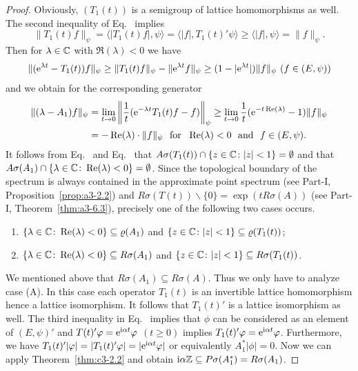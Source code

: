 \begin{proof}
	Obviously, $(T_{1}(t))$ is a semigroup of lattice homomorphisms as well. 
	The second inequality of Eq.~ implies
	\begin{equation}\label{eq:c3-4.3}
	\|T_{1}(t)f\|_{\psi} = \langle|T_{1}(t)f|,\psi\rangle = \langle|f|,T_{1}(t)'\psi\rangle \geq \langle|f|,\psi\rangle = \|f\|_{\psi} .
	\end{equation}
	Then for $\lambda \in \mathbb{C} $ with $\Re(\lambda) < 0$ we have 
	\[ 
	\|(\eu^{\lambda t}-T_{1}(t))f\|_{\psi} \geq \|T_{1}(t)f\|_{\psi}-\|\eu^{\lambda t}f\|_{\psi} \geq (1-|\eu^{\lambda t}|)\|f\|_{\psi} \ (f \in (E,\psi))
	\]
	and we obtain for the corresponding generator
	\begin{equation}\label{eq:c3-4.4}
		\begin{split}
		\|(\lambda-A_{1})f\|_{\psi} &= \lim_{t \to 0}\left\|\frac{1}{t}(\eu^{-\lambda t}T_{1}(t)f-f)\right\|_{\psi} \geq \lim_{t \to 0}\frac{1}{t}(\eu^{-t\Re(\lambda)}-1)\|f\|_{\psi}\\
		&= -\Re(\lambda)\cdot\|f\|_{\psi} \ \text{ for } \ \Re(\lambda) < 0 \ \text{ and } \ f \in (E,\psi) .
		\end{split}
	\end{equation}
	It follows from Eq.~ and Eq.~ that $A\sigma(T_{1}(t))\cap\{z \in \mathbb{C}  \colon |z| < 1\} = \emptyset$ and that $A\sigma(A_{1})\cap\{\lambda \in \mathbb{C}  \colon \mathop{}\!\mathrm{Re}(\lambda) < 0\} = \emptyset$. 
	Since the topological boundary of the spectrum is always contained in the approximate point spectrum (see Part-I, Proposition~\ref{prop:a3-2.2}) and 
    $R\sigma(T(t))\backslash\{0\} = \exp(tR\sigma(A))$ (see Part-I, Theorem~\ref{thm:a3-6.3}), precisely one of the following two cases occurs.
	\begin{enumerate}[\upshape (A)]
		\item
		$\{\lambda \in \C  \colon \Re(\lambda) < 0\} \subseteq \rho(A_{1})$ and $\{z \in \C  \colon |z| < 1\} \subseteq \rho(T_{1}(t))$;
		
		\item
		$\{\lambda \in \mathbb{C}  \colon \mathop{}\!\mathrm{Re}(\lambda) < 0\} \subseteq R\sigma(A_{1})$ and $\{z \in \mathbb{C}  \colon |z| < 1\} \subseteq R\sigma(T_{1}(t))$.
	\end{enumerate}
	
	We mentioned above that $R\sigma(A_{1}) \subseteq R\sigma(A)$. 
	Thus we only have to analyze case (A). 
	In this case each operator $T_{1}(t)$ is an invertible lattice homomorphism hence a lattice isomorphism. 
	It follows that $T_{1}(t)'$ is a lattice isomorphism as well. 
	The third inequality in Eq.~ implies that $\phi$ can be considered as an element of\/ $(E,\psi)'$ and $T(t)'\phi = \eu^{\im\alpha t}\phi$ $(t \geq 0)$ implies $T_{1}(t)'\phi = \eu^{\im\alpha t}\phi$. 
	Furthermore, we have
	$T_{1}(t)'|\phi| = |T_{1}(t)'\phi| = |\eu^{\im\alpha t}\phi|$ or equivalently $A_{1}^*|\phi| = 0$.
	Now we can apply 
	Theorem~\ref{thm:c3-2.2} 
	and obtain $\mathrm{i}\alpha\mathbb{Z} \subseteq P\sigma(A_{1}^*) = R\sigma(A_{1})$.
	\end{proof}
